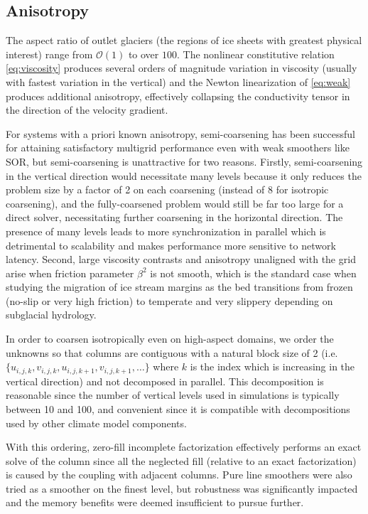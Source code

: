 \documentclass[3p]{elsarticle}
\newcommand{\bigO}{{\mathcal{O}}}
\begin{document}
\subsection{Anisotropy}
The aspect ratio of outlet glaciers (the regions of ice sheets with greatest physical interest)
range from $\bigO(1)$ to over $100$.  The nonlinear constitutive relation \eqref{eq:viscosity}
produces several orders of magnitude variation in viscosity (usually with fastest variation in the
vertical) and the Newton linearization of \eqref{eq:weak} produces additional anisotropy,
effectively collapsing the conductivity tensor in the direction of the velocity gradient.

For systems with a priori known anisotropy, semi-coarsening has been successful for attaining
satisfactory multigrid performance even with weak smoothers like SOR, but semi-coarsening is
unattractive for two reasons.  Firstly, semi-coarsening in the vertical direction would necessitate
many levels because it only reduces the problem size by a factor of 2 on each coarsening (instead of
8 for isotropic coarsening), and the fully-coarsened problem would still be far too large for a
direct solver, necessitating further coarsening in the horizontal direction.  The presence of many
levels leads to more synchronization in parallel which is detrimental to scalability and makes
performance more sensitive to network latency.  Second, large viscosity contrasts and anisotropy
unaligned with the grid arise when friction parameter $\beta^2$ is not smooth, which is the standard
case when studying the migration of ice stream margins as the bed transitions from frozen (no-slip
or very high friction) to temperate and very slippery depending on subglacial hydrology.

In order to coarsen isotropically even on high-aspect domains, we order the unknowns so that columns
are contiguous with a natural block size of 2
(i.e. $\{u_{i,j,k},v_{i,j,k},u_{i,j,k+1},v_{i,j,k+1},\dotsc\}$ where $k$ is the index which is
increasing in the vertical direction) and not decomposed in parallel.  This decomposition is
reasonable since the number of vertical levels used in simulations is typically between 10 and 100,
and convenient since it is compatible with decompositions used by other climate model components.

With this ordering, zero-fill incomplete factorization effectively performs an exact solve of the
column since all the neglected fill (relative to an exact factorization) is caused by the coupling
with adjacent columns.  Pure line smoothers were also tried as a smoother on the finest level, but
robustness was significantly impacted and the memory benefits were deemed insufficient to pursue
further.
\end{document}
